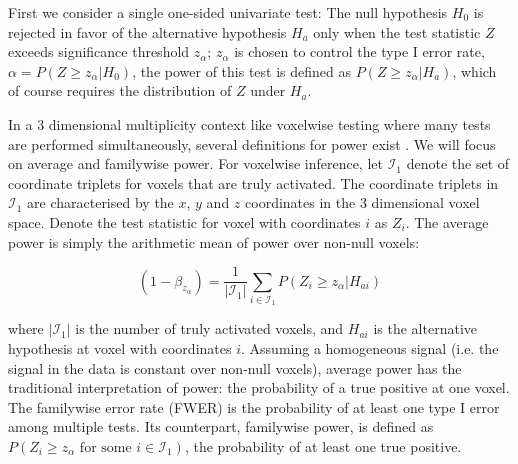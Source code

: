 First we consider a single one-sided univariate test: The null hypothesis $H_0$ is rejected in favor of the alternative hypothesis $H_a$ only when the test statistic $Z$ exceeds significance threshold $z_\alpha$; $z_\alpha$ is chosen to control the type I error rate, $\alpha=P(Z \geq z_\alpha|H_0)$, the power of this test is defined as $P(Z \geq z_\alpha | H_{a})$, which of course requires the distribution of $Z$ under $H_a$.

In a 3 dimensional multiplicity context like voxelwise testing where many tests are performed simultaneously, several definitions for power exist \citep{Dudoit2003}. We will focus on average and familywise power.  For voxelwise inference, let $\mathcal{I}_1$ denote the set of coordinate triplets for voxels that are truly activated. The coordinate triplets in $\mathcal{I}_1$ are characterised by  the $x$, $y$ and $z$ coordinates in the 3 dimensional voxel space. Denote the test statistic for voxel with coordinates $i$ as  $Z_i$.  The average power is simply the arithmetic mean of power over non-null voxels:

\begin{equation}
(1-\beta_{z_\alpha}) = \frac{1}{| \mathcal{I}_1 |} \sum_{ i \in \mathcal{I}_1}P(Z_i \geq z_\alpha | H_{ai}) \label{average power}
\end{equation}

where $| \mathcal{I}_1 |$ is the number of truly activated voxels, and $H_{ai}$ is the alternative hypothesis at voxel  with coordinates $i$.  Assuming a homogeneous signal (i.e. the signal in the data is constant over non-null voxels), average power has the traditional interpretation of power: the probability of a true positive at one voxel.  The familywise error rate (FWER) is the probability of at least one type I error among multiple tests.  Its counterpart, familywise power, is defined as $P(Z_i \geq z_\alpha \text{ for some } i \in \mathcal{I}_1 )$, the probability of at least one true positive.

